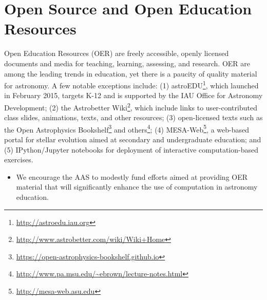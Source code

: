 \documentclass[11pt]{article}
\newenvironment{squishlist}                                                     
  {\begin{itemize}                                                              
    \addtolength{\itemsep}{-0.33\baselineskip}                                  
   }                                                                            
  { \end{itemize} }
\begin{document}




\section{Open Source and Open Education Resources}

Open Education Resources (OER) are freely accessible, openly
licensed documents and media for teaching, learning,
assessing, and research. OER are among the leading trends in 
education, yet there is a paucity of quality material for
astronomy. A few notable exceptions include: (1)
astroEDU\footnote{\url{http://astroedu.iau.org}}, which
launched in February 2015, targets K-12 and is supported by the IAU
Office for Astronomy Development; (2) the Astrobetter
Wiki\footnote{\url{http://www.astrobetter.com/wiki/Wiki+Home}}, which
include links to user-contributed class slides, animations, texts, and
other resources;
(3) open-licensed texts such as the Open Astrophysics Bookshelf\footnote{\url{https://open-astrophysics-bookshelf.github.io}}
and others\footnote{\url{http://www.pa.msu.edu/~ebrown/lecture-notes.html}};
(4) MESA-Web\footnote{\url{http://mesa-web.asu.edu}}, a
web-based portal for stellar evolution aimed at secondary and
undergraduate education; and
(5) IPython/Jupyter notebooks for deployment of interactive computation-based exercises.

\begin{squishlist}
\item
We encourage the AAS to modestly fund efforts aimed at providing OER
material that will significantly enhance the use of computation in astronomy education.
\end{squishlist}
\end{document}
